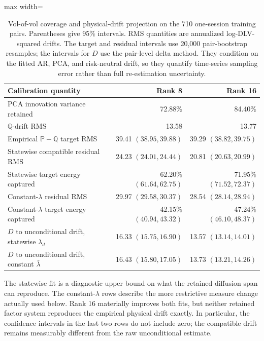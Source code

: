 \documentclass[11pt]{article}
\newcommand{\Q}{\mathbb Q}
\newcommand{\PP}{\mathbb P}
\theoremstyle{plain}
\theoremstyle{definition}
\theoremstyle{remark}
\begin{document}
\begin{table}[H]
\centering
\small
\begin{adjustbox}{max width=\textwidth}
\begin{tabular}{lrr}
\toprule
Calibration quantity & Rank 8 & Rank 16\\
\midrule
PCA innovation variance retained & 72.88\% & 84.40\%\\
$\Q$-drift RMS & 13.58 & 13.77\\
Empirical $\PP-\Q$ target RMS
& 39.41 $(38.95,39.88)$ & 39.29 $(38.82,39.75)$\\
Statewise compatible residual RMS
& 24.23 $(24.01,24.44)$ & 20.81 $(20.63,20.99)$\\
Statewise target energy captured
& 62.20\% $(61.64,62.75)$ & 71.95\% $(71.52,72.37)$\\
Constant-$\lambda$ residual RMS
& 29.97 $(29.58,30.37)$ & 28.54 $(28.14,28.94)$\\
Constant-$\lambda$ target energy captured
& 42.15\% $(40.94,43.32)$ & 47.24\% $(46.10,48.37)$\\
$D$ to unconditional drift, statewise $\lambda_d$
& 16.33 $(15.75,16.90)$ & 13.57 $(13.14,14.01)$\\
$D$ to unconditional drift, constant $\bar\lambda$
& 16.43 $(15.80,17.05)$ & 13.73 $(13.21,14.26)$\\
\bottomrule
\end{tabular}
\end{adjustbox}
\caption{Vol-of-vol coverage and physical-drift projection on the 710
one-session training pairs.  Parentheses give 95\% intervals.  RMS quantities
are annualized log-DLV-squared drifts.  The target and residual intervals use
20,000 pair-bootstrap resamples; the intervals for $D$ use the pair-level
delta method.  They condition on the fitted AR, PCA, and risk-neutral drift,
so they quantify time-series sampling error rather than full re-estimation
uncertainty.}
\label{tab:numerics-calibration}
\end{table}

The statewise fit is a diagnostic upper bound on what the retained diffusion
span can reproduce.  The constant-$\lambda$ rows describe the more restrictive
measure change actually used below.  Rank 16 materially improves both fits,
but neither retained factor system reproduces the empirical physical drift
exactly.  In particular, the confidence intervals in the last two rows do not
include zero; the compatible drift remains measurably different from the raw
unconditional estimate.
\end{document}
